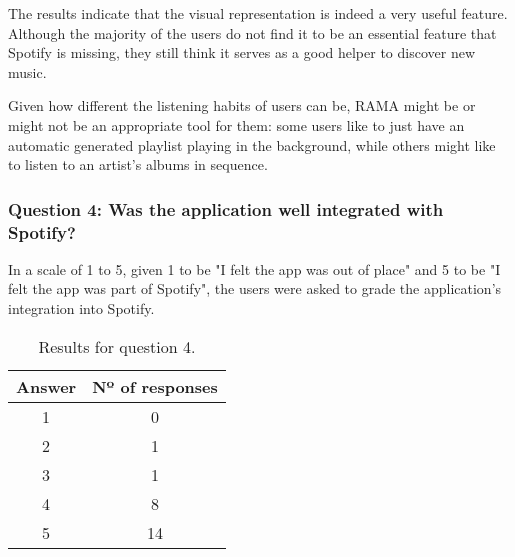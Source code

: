       The results indicate that the visual representation is indeed a very useful feature.
      Although the majority of the users do not find it to be an essential feature that Spotify is missing, they still think it serves as a good helper to discover new music.

      Given how different the listening habits of users can be, RAMA might be or might not be an appropriate tool for them: some users like to just have an automatic generated playlist playing in the background, while others might like to listen to an artist's albums in sequence.



    \subsubsection{Question 4: Was the application well integrated with Spotify?}
    \label{ssub:question_4}

      In a scale of 1 to 5, given 1 to be "I felt the app was out of place" and 5 to be "I felt the app was part of Spotify", the users were asked to grade the application's integration into Spotify.

      \begin{table}[H]
        \begin{center}
          \begin{tabular}{c|c}

            \hline
            \textbf{Answer} & \textbf{Nº of responses} \\
            \hline
            1 & 0 \\
            2 & 1 \\
            3 & 1 \\
            4 & 8 \\
            5 & 14 \\
            \hline
          \end{tabular}
        \end{center}
        \caption{Results for question 4.}
        \label{tab:question4}
       \end{table}

